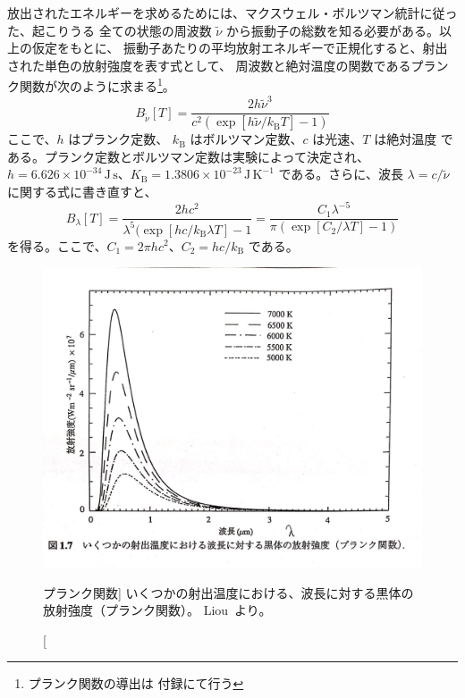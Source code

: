 \documentclass[article,twoside]{dennou777}
\newcommand{\Unit}[1]{\,\mathrm{#1}}
\begin{document}
放出されたエネルギーを求めるためには、マクスウェル・ボルツマン統計に従った、起こりうる
全ての状態の周波数 $\tilde\nu$ から振動子の総数を知る必要がある。以上の仮定をもとに、
振動子あたりの平均放射エネルギーで正規化すると、射出された単色の放射強度を表す式として、
周波数と絶対温度の関数であるプランク関数が次のように求まる\footnote{プランク関数の導出は
付録にて行う}。
\begin{equation}
	B_{\tilde{\nu}}[T]=\frac{2h\tilde{\nu}^3}{c^2(\exp[h\tilde{\nu}/k_\mathrm{B}T]-1)}
\end{equation}
ここで、$h$ はプランク定数、 $k_\mathrm{B}$ はボルツマン定数、$c$ は光速、$T$ は絶対温度
である。プランク定数とボルツマン定数は実験によって決定され、
$h=6.626\times10^{-34}\Unit{J\,s}$、$K_\mathrm{B}=1.3806\times10^{-23}\Unit{J\,K^{-1}}$
である。さらに、波長 $\lambda=c/\tilde\nu$ に関する式に書き直すと、
\begin{equation}
	B_\lambda[T]=\frac{2hc^2}{\lambda^5(\exp[hc/k_\mathrm{B}\lambda T]-1}=
	\frac{C_1\lambda^{-5}}{\pi(\exp[C_2/\lambda T]-1)}
\end{equation}
を得る。ここで、$C_1=2\pi hc^2$、$C_2=hc/k_\mathrm{B}$ である。

\begin{figure}[t]
	\includegraphics[width=\textwidth]{planck.jpg}
	\caption
		[プランク関数]
		{
			いくつかの射出温度における、波長に対する黒体の放射強度（プランク関数）。
			Liou~\cite{liou}より。
		}
\end{figure}
\end{document}
